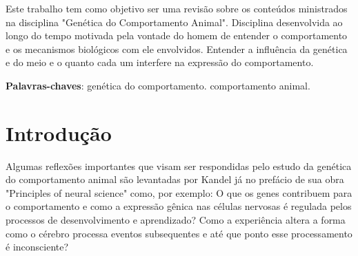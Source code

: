 \documentclass[
	article,			%
	12pt,				%
	oneside,			%
	a4paper,			%
	english,			%
	brazil,				%
	sumario=tradicional
	]{abntex2}
\begin{document}
\frenchspacing 


%
%
\maketitle

\begin{resumoumacoluna}

Este trabalho tem como objetivo ser uma revisão sobre os conteúdos ministrados na disciplina "Genética do Comportamento Animal". Disciplina desenvolvida ao longo do tempo motivada pela vontade do homem de entender o comportamento e os mecanismos biológicos com ele envolvidos. Entender a influência da genética e do meio e o quanto cada um interfere na expressão do comportamento.
 
 \vspace{\onelineskip}
 
 \noindent
 \textbf{Palavras-chaves}: genética do comportamento. comportamento animal.
\end{resumoumacoluna}


\textual

\section{Introdução}
\label{intro}
Algumas reflexões importantes que visam ser respondidas pelo estudo da genética do comportamento animal são levantadas por Kandel já no prefácio de sua obra "Principles of neural science" como, por exemplo: O que os genes contribuem para o comportamento e como a expressão gênica nas células nervosas é regulada pelos processos de desenvolvimento e aprendizado? Como a experiência altera a forma como o cérebro processa eventos subsequentes e até que ponto esse processamento é inconsciente?
\end{document}
